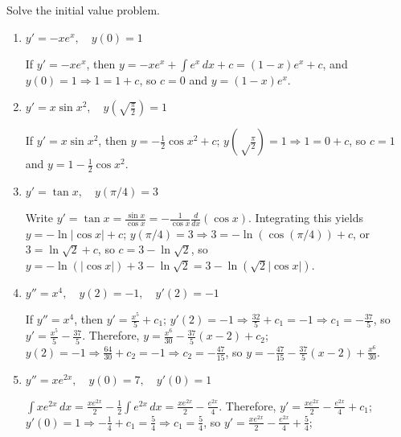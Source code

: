 \documentclass{ximera}
\begin{document}
\begin{problem}\label{exer:1.2.4}
Solve the  initial value problem.

\begin{enumerate}
\item %
 $y'=-xe^x, \quad y(0)=1$



\begin{solution}
    If $y'=-xe^x$, then
$y=-xe^x+\int e^x\,dx+c=(1-x)e^x+c$,
and $y(0)=1\Rightarrow 1=1+c$, so $c=0$ and $y=(1-x)e^x$.
\end{solution}
 
\item %
 $y'=x \sin x^2, \quad y\left(\sqrt{\frac{\pi}{2}}\right)=1$

 

 \begin{solution}
     If
$y'=x\sin x^2$, then
$y=-\frac{1}{2}\cos x^2+c$;
$y\left({\sqrt\frac{\pi}{2}}\right)=1 \Rightarrow 1=0+c$,
so $c=1$ and $y=1-\frac{1}{2}\cos x^2$.
 \end{solution}

\item %
$y'=\tan x, \quad y(\pi/4)=3$



\begin{solution}
    Write $y'=\tan x=\frac{\sin x}{\cos x}=-\frac{1}{\cos
x}\frac{d}{dx}(\cos x)$. Integrating this yields $y=-\ln|\cos x|+c$;
 $y(\pi/4)=3\Rightarrow 3=-\ln\left(\cos(\pi/4)\right)+c$, or
$3=\ln\sqrt2+c$, so $c=3-\ln\sqrt2$, so
$y=-\ln(|\cos x|)+3-\ln\sqrt2=3-\ln(\sqrt2|\cos x|)$.
\end{solution}

\item %
$y''=x^4, \quad y(2)=-1, \quad y'(2)=-1$



\begin{solution}
    If $y''=x^4$, then $y'=\frac{x^5}{5}+c_1$; $y'(2)=-1
\Rightarrow\frac{32}{5}+c_1=-1\Rightarrow c_1=-\frac{37}{5}$,
so $y'=\frac{x^5}{5}-\frac{37}{5}$. Therefore, $y=\frac{x^6}{30}
-\frac{37}{5}(x-2)+c_2$; $y(2)=-1\Rightarrow\frac{64}{30}+c_2=-1
\Rightarrow c_2=-\frac{47}{15}$, so
$y=-\frac{47}{15}-\frac{37}{5}(x-2)+\frac{x^6}{30}$.
\end{solution}

\item %
$y''=xe^{2x}, \quad y(0)=7, \quad y'(0)=1$



\begin{solution}
    $\int xe^{2x}\,dx=\frac{xe^{2x}}{2}-\frac{1}{2}
\int e^{2x}\,dx=\frac{xe^{2x}}{2}-\frac{e^{2x}}{4}$. Therefore,
$y'=\frac{xe^{2x}}{2}-\frac{e^{2x}}{4}+c_1$; $y'(0)=1\Rightarrow
-\frac{1}{4}+c_1=\frac{5}{4}\Rightarrow c_1=\frac{5}{4}$,
so $y'=\frac{xe^{2x}}{2}-\frac{e^{2x}}{4}+\frac{5}{4}$;


\end{solution}
\end{enumerate}
\end{problem}
\end{document}
